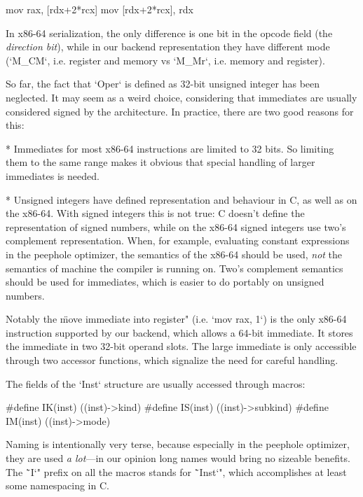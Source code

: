 \begtt
mov rax, [rdx+2*rcx]
mov [rdx+2*rcx], rdx
\endtt

In x86-64 serialization, the only difference is one bit in the opcode field
(the {\em direction bit}), while in our backend representation they have different
mode (`M_CM`, i.e. register and memory vs `M_Mr`, i.e. memory and register).

So far, the fact that `Oper` is defined as 32-bit unsigned integer has been
neglected. It may seem as a weird choice, considering that immediates
are usually considered signed by the architecture. In practice, there are two
good reasons for this:



\begitems
* Immediates for most x86-64 instructions are limited to 32 bits. So limiting
them to the same range makes it obvious that special handling of larger
immediates is needed.

* Unsigned integers have defined representation and behaviour in C, as well as
on the x86-64. With signed integers this is not true: C doesn't define the
representation of signed numbers, while on the x86-64 signed integers use {two's complement}
representation. When, for example, evaluating constant expressions in the peephole
optimizer, the semantics of the x86-64 should be used, {\em not} the semantics
of machine the compiler is running on. Two's complement semantics should be used
for immediates, which is easier to do portably on unsigned numbers.
\enditems

Notably the \"move immediate into register" (i.e. `mov rax, 1`) is the only x86-64 instruction
supported by our backend, which allows a 64-bit immediate. It stores the immediate
in two 32-bit operand slots. The large immediate is only accessible through two
accessor functions, which signalize the need for careful handling.

The fields of the `Inst` structure are usually accessed through macros:

\begtt
#define IK(inst) ((inst)->kind)
#define IS(inst) ((inst)->subkind)
#define IM(inst) ((inst)->mode)
\endtt

Naming is intentionally very terse, because especially in the peephole
optimizer, they are used {\em a
lot}---in our opinion long names would bring no sizeable benefits. The \"`I`"
prefix on all the macros stands for \"`Inst`", which accomplishes at least some
namespacing in C.

